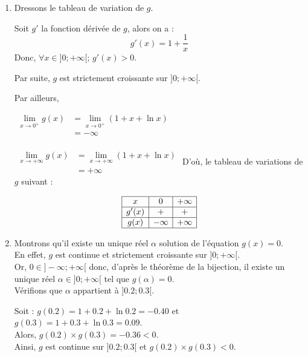 \documentclass[12pt,a4paper]{article}
\begin{document}
\begin{enumerate}
    \item Dressons le tableau de variation de $g$.

Soit $g'$ la fonction dérivée de $g$, alors on a :
\[
g'(x) = 1 + \frac{1}{x}
\]
Donc, $\forall x \in ]0 ; +\infty[ ; \, g'(x) > 0$.

Par suite, $g$ est strictement croissante sur $]0 ; +\infty[$.

Par ailleurs,

$\begin{aligned}
\lim\limits_{x \to 0^+} g(x) &= \lim\limits_{x \to 0^+} (1 + x + \ln x)\\
&= -\infty \\
\end{aligned}$

$\begin{aligned}
\lim\limits_{x \to +\infty} g(x) &= \lim\limits_{x \to +\infty} (1 + x + \ln x) \\
&= +\infty
\end{aligned}$
D'où, le tableau de variations de $g$ suivant :

\[
\begin{array}{|c|c|c|c|}
\hline
x & 0 & +\infty \\
\hline
g'(x) & + & + \\
\hline
g(x) & -\infty & +\infty \\
\hline
\end{array}
\]

\item  Montrons qu'il existe un unique réel $\alpha$ solution de l'équation $g(x) = 0$.\\

En effet, $g$ est continue et strictement croissante sur $]0 ; +\infty[$.\\
Or, $0 \in ]-\infty ; +\infty[$ donc, d'après le théorème de la bijection, il existe un unique réel $\alpha \in ]0 ; +\infty[$ tel que $g(\alpha) = 0$.\\

Vérifions que $\alpha$ appartient à $]0.2 ; 0.3[$.

Soit : $g(0.2) = 1 + 0.2 + \ln 0.2 = -0.40$ et $g(0.3) = 1 + 0.3 + \ln 0.3 = 0.09$.\\
Alors, $g(0.2) \times g(0.3) = -0.36 < 0$.\\

Ainsi, $g$ est continue sur $]0.2 ; 0.3[$ et $g(0.2) \times g(0.3) < 0$.\\


\end{enumerate}
\end{document}
